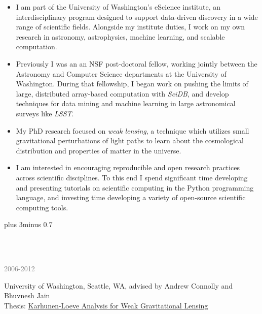 \documentclass{article} %
\def\bf{\bfseries}
\def\sf{\sffamily}
\def\sl{\slshape}
\newlength\sidebarwidth
\newcommand{\topic}[3][]%
	 {\pagebreak[2]%
	 \vskip 1.5\baselineskip plus 3\baselineskip minus 0.7\baselineskip
	 \begin{minipage}{\textwidth}
         \phantomsection\addcontentsline{toc}{section}{#1}%
         \nopagebreak\hspace{0in}%
         \nopagebreak\begin{minipage}[t]{\sidebarwidth - .2cm}
         \raggedleft \bf\sf 
	 \color{deep_blue}{\Large #2}
	 \end{minipage}%
	 \hfill
	 \begin{minipage}[t]{\linewidth - \sidebarwidth}
	 \nopagebreak{\color{deep_blue}%
		    \rule{0pt}{\baselineskip}%
		    \rule{\linewidth}{2.5pt}%
		    \llap{\raisebox{.3\baselineskip}{\sf #1}}%
		    \vspace*{.1\baselineskip}%
		    }%
	 #3%
	 \end{minipage}
	 \end{minipage}}
\newcommand{\subtopic}[3][]
	 {\begin{minipage}{\textwidth}
	 \vspace*{.4\baselineskip}
         \nopagebreak\hspace{0in}%
         \nopagebreak\begin{minipage}[t]{\sidebarwidth - .2cm}
         \raggedleft {\sf\fontseries{sbc}\selectfont #2}
         {\\[-0.2\baselineskip] \textcolor{gray}{\footnotesize #1}}
	 \end{minipage}%
	 \hfill
	 \begin{minipage}[t]{\linewidth - \sidebarwidth}
	 #3%
	 \end{minipage}%
	 \vspace*{.2\baselineskip plus 1\baselineskip minus
	 .2\baselineskip}%
	 \end{minipage}}
\def\mydot{\textcolor{deep_blue}{\rule{1ex}{1ex}}}
\begin{document}
\begin{multicols}{2}
\sloppy


\begin{itemize}[leftmargin=2ex, itemsep=0ex]
\item[\mydot]
I am part of the University of Washington's eScience institute, an
interdisciplinary program designed to support data-driven discovery in a
wide range of scientific fields.  Alongside my institute duties, I work on
my own research in astronomy, astrophysics, machine learning, and
scalable computation.

\item[\mydot]
Previously I was an an NSF post-doctoral fellow,
working jointly between the Astronomy and Computer Science departments
at the University of Washington. During that fellowship, I began work on
pushing the limits of large, distributed array-based computation with
{\it SciDB}, and develop techniques for data mining and machine learning
in large astronomical surveys like {\it LSST}.

\item[\mydot]
My PhD research focused on {\it weak lensing}, a technique which utilizes small
gravitational perturbations of light paths to learn about the cosmological
distribution and properties of matter in the universe.

\item[\mydot]
I am interested in encouraging reproducible and open research practices
across scientific disciplines.  To this end I spend significant time
developing and presenting tutorials on scientific computing in the Python
programming language, and investing time developing a variety of open-source
scientific computing tools.

\end{itemize}
\end{multicols}
\vspace*{-1.5em}
\fussy

\topic{E \large\hskip -1ex DUCATION}{~}

    \subtopic[2006-2012]{\bf PhD}{
        University of Washington, Seattle, WA, advised by Andrew Connolly
        and Bhuvnesh Jain\\
	Thesis: \href{http://adsabs.harvard.edu/abs/2013arXiv1301.6657V}{
          Karhunen-Loeve Analysis for Weak Gravitational Lensing}
    }
\end{document}
